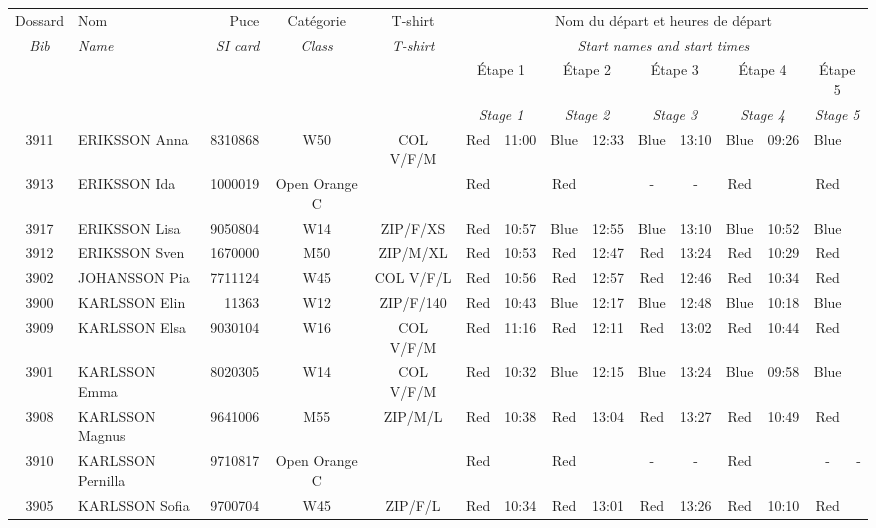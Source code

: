 \documentclass{report}
\begin{document}
  \begin{longtable}{|c|l|r|c|c|*{5}{cc|}}
    Dossard & Nom  & Puce    & Catégorie & T-shirt & \multicolumn{10}{c|}{Nom du départ et heures de départ} \\
    \itshape Bib     & \itshape Name & \itshape SI card & \itshape Class  & \itshape  T-shirt  & \multicolumn{10}{c|}{\itshape Start names and start times} \\
    \hline
    & & & & & \multicolumn{2}{c|}{Étape 1} & \multicolumn{2}{c|}{Étape 2} & \multicolumn{2}{c|}{Étape 3} & \multicolumn{2}{c|}{Étape 4} & \multicolumn{2}{c|}{Étape 5} \\
    & & & & & \multicolumn{2}{c|}{\itshape Stage 1} & \multicolumn{2}{c|}{\itshape Stage 2} & \multicolumn{2}{c|}{\itshape Stage 3} & \multicolumn{2}{c|}{\itshape Stage 4} & \multicolumn{2}{c|}{\itshape Stage 5} \\
    \hline
    3911 & ERIKSSON Anna & 8310868 & W50 & COL V/F/M & Red & 11:00 & Blue & 12:33 & Blue & 13:10 & Blue & 09:26 & Blue &  \\
    3913 & ERIKSSON Ida & 1000019 & Open Orange C &   & Red &   & Red &   & - &  - & Red &   & Red &  \\
    3917 & ERIKSSON Lisa & 9050804 & W14 & ZIP/F/XS & Red & 10:57 & Blue & 12:55 & Blue & 13:10 & Blue & 10:52 & Blue &  \\
    3912 & ERIKSSON Sven & 1670000 & M50 & ZIP/M/XL & Red & 10:53 & Red & 12:47 & Red & 13:24 & Red & 10:29 & Red &  \\
    3902 & JOHANSSON Pia & 7711124 & W45 & COL V/F/L & Red & 10:56 & Red & 12:57 & Red & 12:46 & Red & 10:34 & Red &  \\
    3900 & KARLSSON Elin & 11363 & W12 & ZIP/F/140 & Red & 10:43 & Blue & 12:17 & Blue & 12:48 & Blue & 10:18 & Blue &  \\
    3909 & KARLSSON Elsa & 9030104 & W16 & COL V/F/M & Red & 11:16 & Red & 12:11 & Red & 13:02 & Red & 10:44 & Red &  \\
    3901 & KARLSSON Emma & 8020305 & W14 & COL V/F/M & Red & 10:32 & Blue & 12:15 & Blue & 13:24 & Blue & 09:58 & Blue &  \\
    3908 & KARLSSON Magnus & 9641006 & M55 & ZIP/M/L & Red & 10:38 & Red & 13:04 & Red & 13:27 & Red & 10:49 & Red &  \\
    3910 & KARLSSON Pernilla & 9710817 & Open Orange C &   & Red &   & Red &   & - &  - & Red &   & - &  -\\
    3905 & KARLSSON Sofia & 9700704 & W45 & ZIP/F/L & Red & 10:34 & Red & 13:01 & Red & 13:26 & Red & 10:10 & Red &  \\

\end{longtable}
\end{document}
